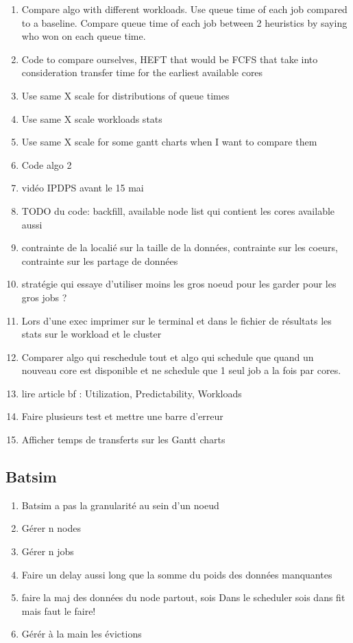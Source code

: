 \documentclass[a4paper]{article}
\begin{document}
\begin{enumerate}
			\item Compare algo with different workloads. Use queue time of each job compared to a baseline. Compare queue time of each job between 2 heuristics by saying who won on each queue time.
			\item Code to compare ourselves, HEFT that would be FCFS that take into consideration transfer time for the earliest available cores
			\item Use same X scale for distributions of queue times
			\item Use same X scale workloads stats
			\item Use same X scale for some gantt charts when I want to compare them
			\item Code algo 2
			\item vidéo IPDPS avant le 15 mai
			\item TODO du code: backfill, available node list qui contient les cores available aussi
			\item contrainte de la localié sur la taille de la données, contrainte sur les coeurs, contrainte sur les partage de données
			\item stratégie qui essaye d'utiliser moins les gros noeud pour les garder pour les gros jobs ?
			\item Lors d'une exec imprimer sur le terminal et dans le fichier de résultats les stats sur le workload et le cluster
			\item Comparer algo qui reschedule tout et algo qui schedule que quand un nouveau core est disponible et ne schedule que 1 seul job a la fois par cores.
			\item lire article bf : Utilization, Predictability, Workloads
			\item Faire plusieurs test et mettre une barre d'erreur
			\item Afficher temps de transferts sur les Gantt charts
		\end{enumerate}
	\subsection{Batsim}
		\begin{enumerate}
			\item Batsim a pas la granularité au sein d'un noeud
			\item Gérer n nodes
			\item Gérer n jobs
			\item Faire un delay aussi long que la somme du poids des données manquantes
			\item faire la maj des données du node partout, sois Dans le scheduler sois dans fit mais faut le faire!
			\item Gérér à la main les évictions
		\end{enumerate}
\end{document}
